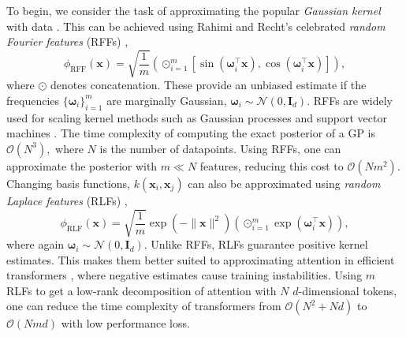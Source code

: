  To begin, we consider the task of approximating the popular \emph{Gaussian kernel}  with data . 
This can be achieved using Rahimi and Recht's celebrated \emph{random Fourier features} (RFFs) \citep{rahimi2007random},
\begin{equation} \label{eq:rff_exp}
    \phi_\textrm{RFF}(\boldsymbol{x}) = \sqrt{\frac{1}{m}} \left( \odot_{i=1}^m \left [ \sin(\boldsymbol{\omega}_i ^\top \boldsymbol{x}), \cos(\boldsymbol{\omega}_i ^\top \boldsymbol{x})\right]\right), 
\end{equation} 
where $\odot$ denotes concatenation. 
These provide an unbiased estimate if the frequencies $\{ \boldsymbol{\omega}_i\}_{i=1}^m$ are marginally Gaussian, $\boldsymbol{\omega}_i \sim \mathcal{N}(0,\mathbf{I}_d)$.
RFFs are widely used for scaling kernel methods such as Gaussian processes \citep[GPs;][]{williams2006gaussian} and support vector machines \citep[SVMs;][]{scholkopf2018learning}.
The time complexity of computing the exact posterior of a GP is $\mathcal{O}(N^3),$ where $N$ is the number of datapoints.
Using RFFs, one can approximate the posterior with $m \ll N$ features, reducing this cost to $\mathcal{O}(Nm^2)$.
Changing basis functions, $k(\boldsymbol{x}_i,\boldsymbol{x}_j)$ can also be approximated using \emph{random Laplace features} (RLFs) \citep{yang2014random},
\begin{equation} \label{eq:rlf_exp}
     \phi_\textrm{RLF}(\boldsymbol{x}) = \sqrt{\frac{1}{m}} \exp(-\|\boldsymbol{x}\|^2)( \odot_{i=1}^m \exp(\boldsymbol{\omega}_i^\top \boldsymbol{x})),
\end{equation}
where again $\boldsymbol{\omega}_i \sim \mathcal{N}(0,\mathbf{I}_d).$
Unlike RFFs, RLFs guarantee positive kernel estimates.
This makes them better suited to approximating attention in efficient transformers \citep{choromanski2020rethinking}, where negative estimates cause training instabilities.
Using $m$ RLFs to get a low-rank decomposition of attention with $N$ $d$-dimensional tokens, one can reduce the time complexity of transformers from $\mathcal{O}(N^2+Nd)$ to $\mathcal{O}(Nmd)$ with low performance loss.

